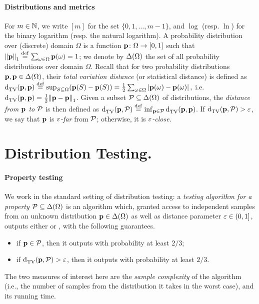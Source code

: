 \paragraph{Distributions and metrics} 
For $m \in \mathbb{N}$, we write $[m]$ for the set $\{0,1,\dots,m-1\}$, and $\log$ (resp. $\ln$) for the binary logarithm (resp. the natural logarithm). A probability distribution over (discrete) domain $\Omega$ is a function $\mathbf{p}\colon\Omega\to[0,1]$ such that ${\lVert\mathbf{p}{\rVert}}_1\stackrel{\rm def}{=} \sum_{\omega\in\Omega}\mathbf{p}(\omega)=1$; we denote by $\Delta\!\left(\Omega\right)$ the set of all probability distributions over domain $\Omega$. 
Recall that for two probability distributions $\mathbf{p},\mathbf{p}\in\Delta\!\left(\Omega\right)$, their \emph{total variation distance} (or statistical distance) is defined as 
$
     {\operatorname{d}_{\textrm{TV}}^{}\!\left({\mathbf{p}, \mathbf{p}}\right)} \stackrel{\rm def}{=} \sup_{S\subseteq\Omega} (\mathbf{p}(S)-\mathbf{p}(S)) = \frac{1}{2}\sum_{\omega\in\Omega} \left\lvert \mathbf{p}(\omega)-\mathbf{p}(\omega) \right\rvert,
$
i.e. $ {\operatorname{d}_{\textrm{TV}}^{}\!\left({\mathbf{p}, \mathbf{p}}\right)} = \frac{1}{2}{\lVert\mathbf{p}-\mathbf{p}{\rVert}}_1$. Given a subset $\mathcal{P}\subseteq \Delta\!\left(\Omega\right)$ of distributions, the \emph{distance from $\mathbf{p}$ to $\mathcal{P}$} is then defined as $ {\operatorname{d}_{\textrm{TV}}^{}\!\left({\mathbf{p}, \mathcal{P}}\right)}\stackrel{\rm def}{=} \inf_{\mathbf{p}\in\mathcal{P}}  {\operatorname{d}_{\textrm{TV}}^{}\!\left({\mathbf{p}, \mathbf{p}}\right)}$. If $ {\operatorname{d}_{\textrm{TV}}^{}\!\left({\mathbf{p}, \mathcal{P}}\right)} > \varepsilon$, we say that $\mathbf{p}$ is \emph{$\varepsilon$-far} from $\mathcal{P}$; otherwise, it is \emph{$\varepsilon$-close}.


\section{Distribution Testing.} 

\paragraph{Property testing}
We work in the standard setting of distribution testing: a \emph{testing algorithm for a property $\mathcal{P}\subseteq\Delta\!\left(\Omega\right)$} is an algorithm which, granted access to independent samples from an unknown distribution $\mathbf{p}\in\Delta\!\left(\Omega\right)$ as well as distance parameter $\varepsilon\in(0,1]$, outputs either \accept or \reject, with the following guarantees.
\begin{itemize}
  \item if $\mathbf{p}\in\mathcal{P}$, then it outputs \accept with probability at least $2/3$;
  \item if $ {\operatorname{d}_{\textrm{TV}}^{}\!\left({\mathbf{p}, \mathcal{P}}\right)}>\varepsilon$, then it outputs \reject with probability at least $2/3$.
\end{itemize}
The two measures of interest here are the \emph{sample complexity} of the algorithm (i.e., the number of samples from the distribution it takes in the worst case), and its running time.

